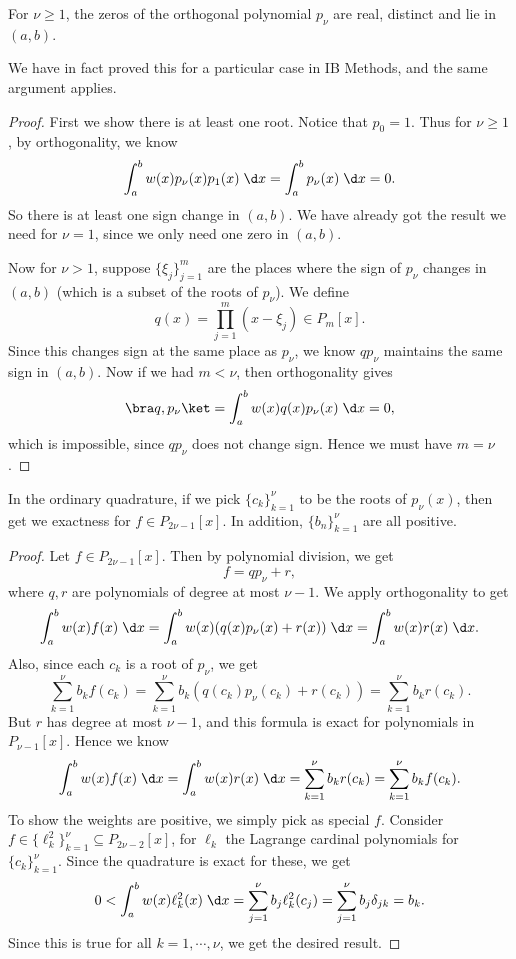 \documentclass[a4paper]{article}
\begin{document}
\begin{thm}
  For $\nu \geq 1$, the zeros of the orthogonal polynomial $p_\nu$ are real, distinct and lie in $(a, b)$.
\end{thm}
We have in fact proved this for a particular case in IB Methods, and the same argument applies.

\begin{proof}
  First we show there is at least one root. Notice that $p_0 = 1$. Thus for $\nu \geq 1$, by orthogonality, we know
  \[
    \int_a^b w(x) p_\nu(x) p_1(x)\;\d x = \int_a^b p_\nu(x)\;\d x = 0.
  \]
  So there is at least one sign change in $(a, b)$. We have already got the result we need for $\nu = 1$, since we only need one zero in $(a, b)$.

  Now for $\nu > 1$, suppose $\{\xi_j\}_{j = 1}^m$ are the places where the sign of $p_\nu$ changes in $(a, b)$ (which is a subset of the roots of $p_\nu$). We define
  \[
    q(x) = \prod_{j = 1}^m (x - \xi_j) \in P_m[x].
  \]
  Since this changes sign at the same place as $p_\nu$, we know $q p_\nu$ maintains the same sign in $(a, b)$. Now if we had $m < \nu$, then orthogonality gives
  \[
    \bra q, p_\nu\ket = \int_a^b w(x)q(x) p_\nu(x)\;\d x = 0,
  \]
  which is impossible, since $qp_\nu$ does not change sign. Hence we must have $m = \nu$.
\end{proof}

\begin{thm}
  In the ordinary quadrature, if we pick $\{c_k\}_{k = 1}^\nu$ to be the roots of $p_\nu(x)$, then get we exactness for $f \in P_{2\nu - 1}[x]$. In addition, $\{b_n\}_{k = 1}^\nu$ are all positive.
\end{thm}

\begin{proof}
  Let $f \in P_{2 \nu - 1}[x]$. Then by polynomial division, we get
  \[
    f = qp_\nu + r,
  \]
  where $q, r$ are polynomials of degree at most $\nu - 1$. We apply orthogonality to get
  \[
    \int_a^b w(x) f(x)\;\d x = \int_a^b w(x) (q(x) p_\nu(x) + r(x)) \;\d x= \int_a^b w(x) r(x)\;\d x.
  \]
  Also, since each $c_k$ is a root of $p_\nu$, we get
  \[
    \sum_{k = 1}^\nu b_k f(c_k) = \sum_{k = 1}^\nu b_k (q(c_k) p_\nu(c_k) + r(c_k)) = \sum_{k = 1}^\nu b_k r(c_k).
  \]
  But $r$ has degree at most $\nu - 1$, and this formula is exact for polynomials in $P_{\nu - 1}[x]$. Hence we know
  \[
    \int_a^b w(x) f(x)\;\d x = \int_a^b w(x) r(x)\;\d x = \sum_{k = 1}^\nu b_k r(c_k) = \sum_{k = 1}^\nu b_k f(c_k).
  \]
  To show the weights are positive, we simply pick as special $f$. Consider $f \in \{\ell_k^2\}_{k = 1}^\nu \subseteq P_{2\nu - 2}[x]$, for $\ell_k$ the Lagrange cardinal polynomials for $\{c_k\}_{k = 1}^\nu$. Since the quadrature is exact for these, we get
  \[
    0 < \int_a^b w(x)\ell_k^2(x)\;\d x = \sum_{j = 1}^\nu b_j \ell_k^2(c_j) = \sum_{j = 1}^\nu b_j \delta_{jk} = b_k.
  \]
  Since this is true for all $k = 1, \cdots, \nu$, we get the desired result.
\end{proof}
\end{document}
